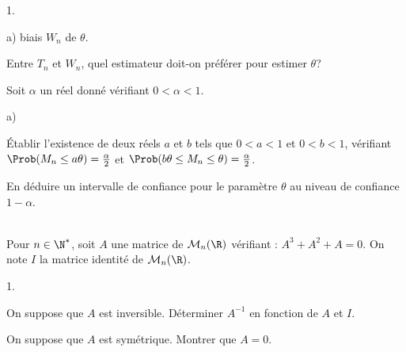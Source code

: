 \documentclass[11pt]{article}%
\begin{document}
\begin{exerciceAP}
\begin{noliste}{1.}
\begin{noliste}{a)}
      biais $W_n$ de $\theta$. 
    \item Entre $T_n$ et $W_n$, quel estimateur doit-on préférer pour
      estimer $\theta$?  
    \end{noliste}
  \item Soit $\alpha$ un réel donné vérifiant $0 < \alpha < 1$. 
    \begin{noliste}{a)}
    \setlength{\itemsep}{2mm}
    \item Établir l'existence de deux réels $a$ et $b$ tels que $0 < a
      < 1$ et $0 < b < 1$, vérifiant $\Prob(M_n \leq a \theta)=
      \frac{\alpha}{2}$ et $\Prob(b  \theta  \leq M_n \leq \theta)=
      \frac{\alpha}{2}$. 
    \item En déduire un intervalle de confiance pour le paramètre
      $\theta$ au niveau de confiance $1-\alpha$.
    \end{noliste}
  \end{noliste}
\end{exerciceAP}


\begin{exerciceSP}~\\
  Pour $n \in \N^*$, soit $A$ une matrice de $\mathcal{M}_n(\R)$
  vérifiant : $A^3+A^2+A=0$. On note $I$ la matrice identité de
  $\mathcal{M}_n(\R)$.
  \begin{noliste}{1.}
    \setlength{\itemsep}{2mm}
  \item On suppose que $A$ est inversible. Déterminer $A^{-1}$ en
    fonction de $A$ et $I$.
  \item On suppose que $A$ est symétrique. Montrer que $A=0$.
  \end{noliste}
\end{exerciceSP}




\end{document}
